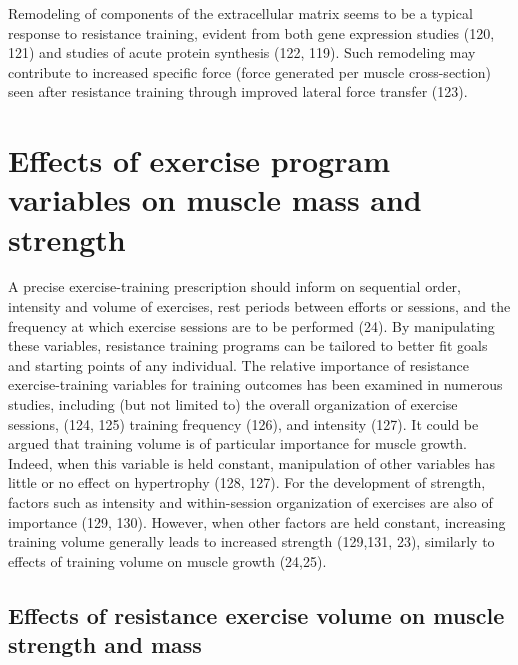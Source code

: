 \documentclass[twoside,10pt]{gihclass} %
\begin{document}
Remodeling of components of the extracellular matrix seems to be a typical response to resistance training, evident from both gene expression studies
(120, 121)
and studies of acute protein synthesis
(122, 119).
Such remodeling may contribute to increased specific force (force generated per muscle cross-section) seen after resistance training through improved lateral force transfer
(123).

\hypertarget{effects-of-exercise-program-variables-on-muscle-mass-and-strength}{%
\section{Effects of exercise program variables on muscle mass and strength}\label{effects-of-exercise-program-variables-on-muscle-mass-and-strength}}

A precise exercise-training prescription should inform on sequential order, intensity and volume of exercises, rest periods between efforts or sessions, and the frequency at which exercise sessions are to be performed
(24).
By manipulating these variables, resistance training programs can be tailored to better fit goals and starting points of any individual.
The relative importance of resistance exercise-training variables for training outcomes has been examined in numerous studies, including (but not limited to) the overall organization of exercise sessions,
(124, 125)
training frequency
(126),
and intensity
(127).
It could be argued that training volume is of particular importance for muscle growth.
Indeed, when this variable is held constant, manipulation of other variables has little or no effect on hypertrophy
(128, 127).
For the development of strength, factors such as intensity and within-session organization of exercises are also of importance
(129, 130).
However, when other factors are held constant, increasing training volume generally leads to increased strength
(129,131, 23),
similarly to effects of training volume on muscle growth
(24,25).

\hypertarget{effects-of-resistance-exercise-volume-on-muscle-strength-and-mass}{%
\subsection{Effects of resistance exercise volume on muscle strength and mass}\label{effects-of-resistance-exercise-volume-on-muscle-strength-and-mass}}
\end{document}
